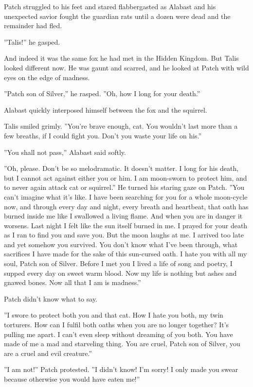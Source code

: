 \documentclass[12pt]{book}
\begin{document}
Patch struggled to his feet and stared flabbergasted as Alabast and
his unexpected savior fought the guardian rats until a dozen were dead
and the remainder had fled.

''Talis!'' he gasped.

And indeed it was the same fox he had met in the Hidden Kingdom. But
Talis looked different now. He was gaunt and scarred, and he looked at
Patch with wild eyes on the edge of madness.

''Patch son of Silver,'' he rasped. ''Oh, how I long for your death.''

Alabast quickly interposed himself between the fox and the squirrel.

Talis smiled grimly. ''You're brave enough, cat. You wouldn't last
more than a few breaths, if I could fight you. Don't you waste your
life on his.''

''You shall not pass,'' Alabast said softly.

''Oh, please. Don't be so melodramatic. It doesn't matter. I long for
his death, but I cannot act against either you or him. I am moon-sworn
to protect him, and to never again attack cat or squirrel.'' He turned
his staring gaze on Patch. ''You can't imagine what it's like. I have
been searching for you for a whole moon-cycle now, and through every
day and night, every breath and heartbeat, that oath has burned inside
me like I swallowed a living flame. And when you are in danger it
worsens. Last night I felt like the sun itself burned in me. I prayed
for your death as I ran to find you and save you. But the moon laughs
at me. I arrived too late and yet somehow you survived. You don't know
what I've been through, what sacrifices I have made for the sake of
this sun-cursed oath. I hate you with all my soul, Patch son of
Silver. Before I met you I lived a life of song and poetry, I supped
every day on sweet warm blood. Now my life is nothing but ashes and
gnawed bones. Now all that I am is madness.''

Patch didn't know what to say.

''I swore to protect both you and that cat. How I hate you both, my
twin torturers. How can I fulfil both oaths when you are no longer
together? It's pulling me apart. I can't even sleep without dreaming
of you both. You have made of me a mad and starveling thing. You are
cruel, Patch son of Silver, you are a cruel and evil creature.''

''I am not!'' Patch protested. ''I didn't know! I'm sorry! I only made
you swear because otherwise you would have eaten me!''
\end{document}
